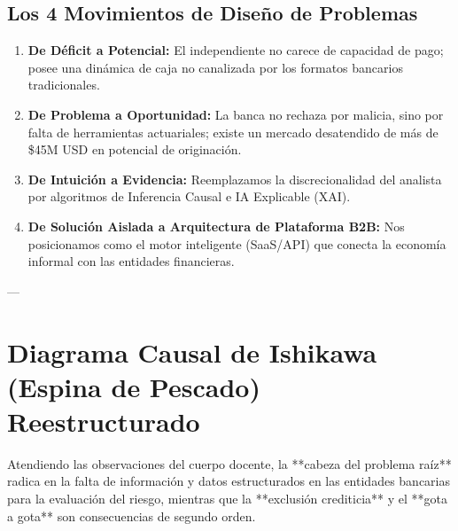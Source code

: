 \documentclass[11pt,a4paper]{article}
\begin{document}
\subsection{Los 4 Movimientos de Diseño de Problemas}
\begin{enumerate}
    \item \textbf{De Déficit a Potencial:} El independiente no carece de capacidad de pago; posee una dinámica de caja no canalizada por los formatos bancarios tradicionales.
    \item \textbf{De Problema a Oportunidad:} La banca no rechaza por malicia, sino por falta de herramientas actuariales; existe un mercado desatendido de más de \$45M USD en potencial de originación.
    \item \textbf{De Intuición a Evidencia:} Reemplazamos la discrecionalidad del analista por algoritmos de Inferencia Causal e IA Explicable (XAI).
    \item \textbf{De Solución Aislada a Arquitectura de Plataforma B2B:} Nos posicionamos como el motor inteligente (SaaS/API) que conecta la economía informal con las entidades financieras.
\end{enumerate}

---

\section{Diagrama Causal de Ishikawa (Espina de Pescado) Reestructurado}
Atendiendo las observaciones del cuerpo docente, la **cabeza del problema raíz** radica en la falta de información y datos estructurados en las entidades bancarias para la evaluación del riesgo, mientras que la **exclusión crediticia** y el **gota a gota** son consecuencias de segundo orden.
\end{document}
